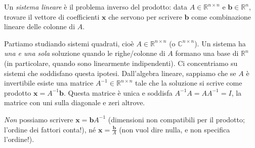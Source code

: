 \documentclass[a4paper]{report}
\theoremstyle{definition}
\theoremstyle{remark}
\begin{document}



Un \emph{sistema lineare} è il problema inverso del prodotto: data $A\in\mathbb{R}^{n\times n}$ e $\mathbf{b} \in \mathbb{R}^n$, trovare il vettore di coefficienti $\mathbf{x}$ che servono per scrivere $\mathbf{b}$ come combinazione lineare delle colonne di $A$.

Partiamo studiando sistemi quadrati, cioè $A \in \mathbb{R}^{n\times n}$ (o $\mathbb{C}^{n\times n}$). Un sistema ha \emph{una e una sola} soluzione quando le righe/colonne di $A$ formano una base di $\mathbb{R}^n$ (in particolare, quando sono linearmente indipendenti). Ci concentriamo su sistemi che soddisfano questa ipotesi. Dall'algebra lineare, sappiamo che se $A$ è invertibile esiste una matrice $A^{-1}\in\mathbb{R}^{n\times n}$ tale che la soluzione si scrive come prodotto $\mathbf{x} = A^{-1}\mathbf{b}$. Questa matrice è unica e soddisfa $A^{-1}A=AA^{-1}= I$, la matrice con uni sulla diagonale e zeri altrove.

\marginpar{\dbend}\emph{Non} possiamo scrivere $\mathbf{x} = \mathbf{b}A^{-1}$ (dimensioni non compatibili per il prodotto; l'ordine dei fattori conta!), né $\mathbf{x} = \frac{\mathbf{b}}{A}$ (non vuol dire nulla, e non specifica l'ordine!).
\end{document}
